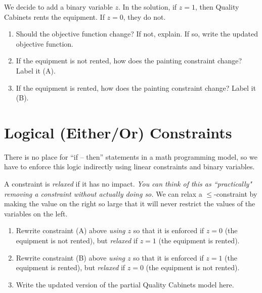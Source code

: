 \documentclass[11pt]{article}
\theoremstyle{definition}
\newcommand{\answerbox}[3]{%
  \fbox{%
    \begin{minipage}[#1]{#2}
      \hfill\vspace{#3}
    \end{minipage}
  }
}
\newcommand{\answerboxone}[2]{%
  \answerbox{#1}{6.0in}{#2} 
}
\begin{document}
We decide to add a binary variable $z$.  In the solution, if $z = 1$, then Quality Cabinets rents the equipment.  If $z = 0$, they do not.  

\newpage
\begin{enumerate}[resume]
\item Should the objective function change?  If not, explain.  If so, write the updated objective function.\\
\answerboxone{c}{0.7in}

\item If the equipment is not rented, how does the painting constraint change?  Label it (A).\\
\answerboxone{c}{0.7in}

\item If the equipment is rented, how does the painting constraint change?  Label it (B).\\
\answerboxone{c}{0.7in}
\end{enumerate}

\section{Logical (Either/Or) Constraints}
There is no place for ``if -- then'' statements in a math programming model, so we have to enforce this logic indirectly using linear constraints and binary variables.

\begin{tcolorbox}
A constraint is \emph{relaxed} if it has no impact. \emph{You can think of this as ``practically" removing a constraint without actually doing so.}  We can relax a $\leq$-constraint by making the value on the right so large that it will never restrict the values of the variables on the left.
\end{tcolorbox}

\begin{enumerate}[resume]
\item Rewrite constraint (A) above \emph{using $z$} so that it is enforced if $z = 0$ (the equipment is not rented), but \emph{relaxed} if $z = 1$ (the equipment is rented). \\ 
\answerboxone{c}{1in}

\item Rewrite constraint (B) above \emph{using $z$} so that it is enforced if $z = 1$ (the equipment is rented), but \emph{relaxed} if $z = 0$ (the equipment is not rented). \\ 
\answerboxone{c}{1in}

\item Write the updated version of the partial Quality Cabinets model here.\\
\answerboxone{c}{2in}
\end{enumerate}
\end{document}
